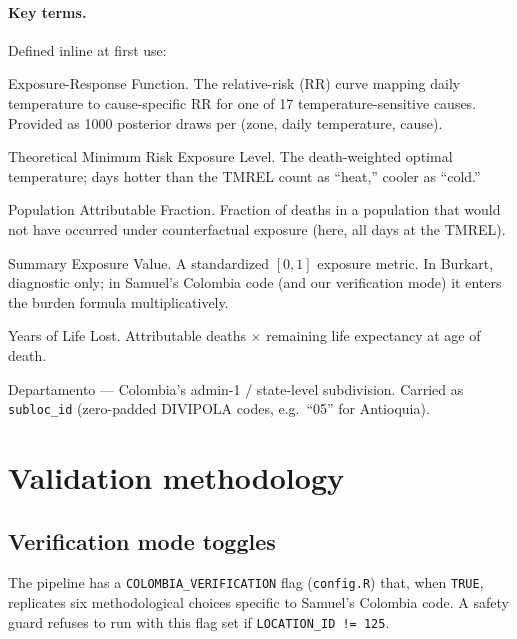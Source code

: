 \documentclass[11pt]{article}
\begin{document}
\paragraph{Key terms.} Defined inline at first use:
\begin{description}[style=multiline,leftmargin=3.5cm]
  \item[ERF] Exposure-Response Function. The relative-risk (RR) curve mapping
    daily temperature to cause-specific RR for one of 17 temperature-sensitive
    causes. Provided as 1000 posterior draws per (zone, daily temperature, cause).
  \item[TMREL] Theoretical Minimum Risk Exposure Level. The death-weighted
    optimal temperature; days hotter than the TMREL count as ``heat,''
    cooler as ``cold.''
  \item[PAF] Population Attributable Fraction. Fraction of deaths in a
    population that would not have occurred under counterfactual exposure
    (here, all days at the TMREL).
  \item[SEV] Summary Exposure Value. A standardized $[0,1]$ exposure metric.
    In Burkart, diagnostic only; in Samuel's Colombia code (and our
    verification mode) it enters the burden formula multiplicatively.
  \item[YLL] Years of Life Lost. Attributable deaths $\times$ remaining
    life expectancy at age of death.
  \item[depto] Departamento --- Colombia's admin-1 / state-level
    subdivision. Carried as \texttt{subloc\_id} (zero-padded
    DIVIPOLA codes, e.g.\ ``05'' for Antioquia).
\end{description}

\section{Validation methodology}

\subsection{Verification mode toggles}
\label{subsec:toggles}

The pipeline has a \texttt{COLOMBIA\_VERIFICATION} flag (\texttt{config.R}) that,
when \texttt{TRUE}, replicates six methodological choices specific to Samuel's
Colombia code. A safety guard refuses to run with this flag set if
\texttt{LOCATION\_ID != 125}.
\end{document}
